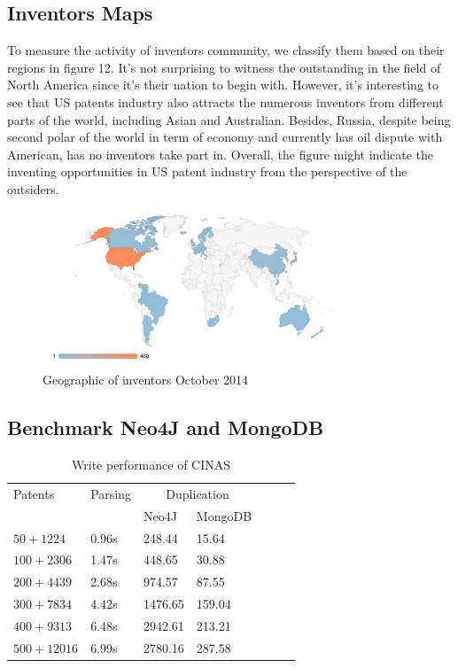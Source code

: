 \documentclass{sig-alternate}
\begin{document}
{ \subsection{Inventors Maps}
To measure the activity of inventors community, we classify them based on their regions in figure 12. It's not surprising to witness the outstanding in the field of North America since it's their nation to begin with. However, it's interesting to see that US patents industry also attracts the numerous inventors from different parts of the world, including Asian and Australian. Besides, Russia, despite being second polar of the world in term of economy and currently has oil dispute with American, has no inventors take part in. Overall, the figure might indicate the inventing opportunities in US patent industry from the perspective of the outsiders.
 \begin{figure}[!htb]
\centering
\includegraphics[width=90mm]{inventor-map.png}
\caption{ Geographic of inventors October 2014 }
\end{figure}

 \subsection{Benchmark Neo4J and MongoDB}
 \begin{table}[!ht]
 \centering

\begin{tabular}{lllllll}
\toprule 
    Patents & \multicolumn{1}{c}{Parsing} &\multicolumn{2}{c}{Duplication}\\

    & 
    & Neo4J & MongoDB\\
    \midrule
    $50 + 1224$     & 0.96s   &248.44 & 15.64 \\
    $100 + 2306$  & 1.47s &448.65 & 30.88\\
    $200 + 4439$  & 2.68s &974.57 & 87.55\\
    $300 + 7834$  & 4.42s&1476.65 & 159.04\\
    $400 + 9313$  & 6.48s &2942.61 & 213.21\\
    $500 + 12016$  & 6.99s&2780.16 & 287.58\\
    \bottomrule
\end{tabular}
\caption{Write performance of CINAS}
\end{table}

}
\end{document}

